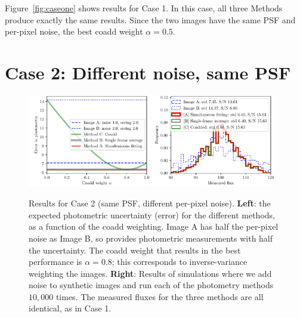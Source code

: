 \documentclass[letter,11pt]{article}
\begin{document}
Figure~\ref{fig:caseone} shows results for Case 1.  In this case, all
three Methods produce exactly the same results.  Since the two images
have the same PSF and per-pixel noise, the best coadd weight $\alpha =
0.5$.


\section*{Case 2: Different noise, same PSF}

\begin{figure}[h!]
  \begin{center}
    \includegraphics[width=0.48\textwidth]{coadd-02}
    \includegraphics[width=0.48\textwidth]{coadd-03}
  \end{center}
  \caption{Results for Case 2 (same PSF, different per-pixel noise).
    \textbf{Left}: the expected photometric
    uncertainty (error) for the different methods, as a function of
    the coadd weighting.  Image A has half the per-pixel noise as Image B,
    so provides photometric measurements with half the uncertainty.
    The coadd weight that results in the best performance is $\alpha = 0.8$;
    this corresponds to inverse-variance weighting the images.
    \newline \textbf{Right}: Results of simulations where we
    add noise to synthetic images and run each of the
    photometry methods $10,000$ times.  The measured fluxes for
    the three methods are all identical, as in Case 1.
    \label{fig:casetwo}}
\end{figure}
\end{document}
